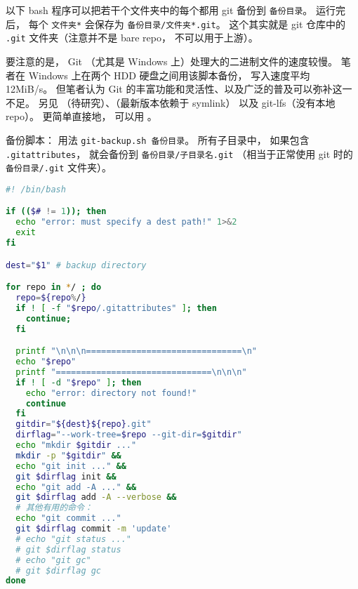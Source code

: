 
\begin{issues}
\issueDraft
\end{issues}


以下 bash 程序可以把若干个文件夹中的每个都用 git 备份到 \verb`备份目录`。 运行完后， 每个 \verb`文件夹*` 会保存为 \verb`备份目录/文件夹*.git`。 这个其实就是 git 仓库中的 \verb`.git` 文件夹（注意并不是 bare repo， 不可以用于上游）。

要注意的是， Git （尤其是 Windows 上）处理大的二进制文件的速度较慢。 笔者在 Windows 上在两个 HDD 硬盘之间用该脚本备份， 写入速度平均 12MiB/s。 但笔者认为 Git 的丰富功能和灵活性、以及广泛的普及可以弥补这一不足。 另见 （待研究）、（最新版本依赖于 symlink） 以及 git-lfs（没有本地repo）。 更简单直接地， 可以用 。

备份脚本： 用法 \verb`git-backup.sh 备份目录`。 所有子目录中， 如果包含 \verb`.gitattributes`， 就会备份到 \verb`备份目录/子目录名.git` （相当于正常使用 git 时的 \verb`备份目录/.git` 文件夹）。
\begin{lstlisting}[language=bash, caption=git-backup.sh]
#! /bin/bash

if (($# != 1)); then
  echo "error: must specify a dest path!" 1>&2
  exit
fi

dest="$1" # backup directory

for repo in */ ; do
  repo=${repo%/}
  if ! [ -f "$repo/.gitattributes" ]; then
    continue;
  fi

  printf "\n\n\n===============================\n"
  echo "$repo"
  printf "===============================\n\n\n"
  if ! [ -d "$repo" ]; then
    echo "error: directory not found!"
    continue
  fi
  gitdir="${dest}${repo}.git"
  dirflag="--work-tree=$repo --git-dir=$gitdir"
  echo "mkdir $gitdir ..."
  mkdir -p "$gitdir" &&
  echo "git init ..." &&
  git $dirflag init &&
  echo "git add -A ..." &&
  git $dirflag add -A --verbose &&
  # 其他有用的命令：
  echo "git commit ..."
  git $dirflag commit -m 'update'
  # echo "git status ..."
  # git $dirflag status
  # echo "git gc"
  # git $dirflag gc
done
\end{lstlisting}


